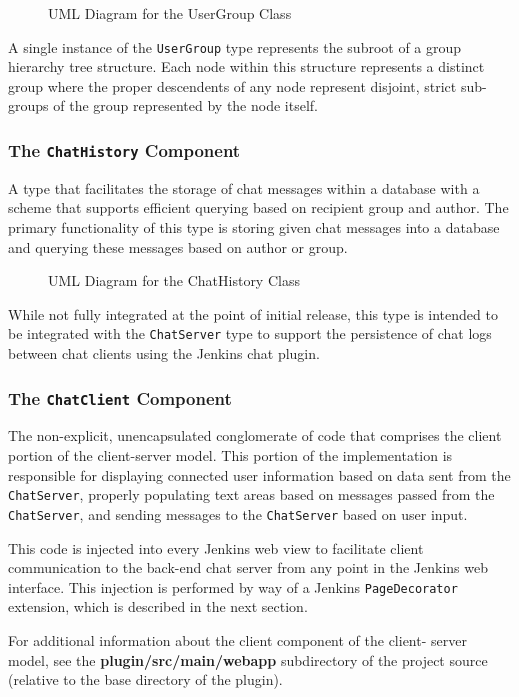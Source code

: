 \documentclass{article}
\newcommand{\classname}[1] {\texttt{#1}}
\newcommand{\insertdiagram}[2]
{
	\begin{figure}[H]
		\centering
		\fbox{\texttt{[image: figures/\#1]}}
		\caption{UML Diagram for the #1 Class}
	\end{figure}
}
\begin{document}
			\insertdiagram{UserGroup}{1.25in}

			A single instance of the \classname{UserGroup} type represents the
			subroot of a group hierarchy tree structure.  Each node within this
			structure represents a distinct group where the proper descendents of
			any node represent disjoint, strict sub-groups of the group 
			represented by the node itself.

			\subsubsection[\classname{ChatHistory}]{The \classname{ChatHistory} Component}
			A type that facilitates the storage of
			chat messages within a database with a scheme that supports efficient 
			querying based on recipient group and author.  The primary functionality 
			of this type is storing given chat messages into a database and querying 
			these messages based on author or group.
			\insertdiagram{ChatHistory}{0.50in}
			While not fully integrated at the point of initial release, this
			type is intended to be integrated with the \classname{ChatServer}
			type to support the persistence of chat logs between chat clients
			using the Jenkins chat plugin.

			\subsubsection[\classname{ChatClient}]{The \classname{ChatClient} Component}
			The non-explicit, unencapsulated 
			conglomerate of code that comprises the client portion of the 
			client-server model.  This portion of the implementation is responsible
			for displaying connected user information based on data sent from
			the \classname{ChatServer}, properly populating text areas based on
			messages passed from the \classname{ChatServer}, and sending messages
			to the \classname{ChatServer} based on user input.

			This code is injected into every Jenkins web view to facilitate
			client communication to the back-end chat server from any point
			in the Jenkins web interface.  This injection is performed by way
			of a Jenkins \classname{PageDecorator} extension, which is described
			in the next section.

			For additional information about the client component of the client-
			server model, see the \textbf{plugin/src/main/webapp} subdirectory 
			of the project source (relative to the base directory of the plugin).
\end{document}
